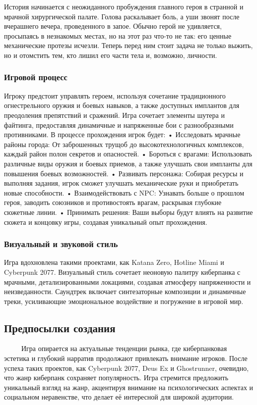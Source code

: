 \documentclass{article}
\begin{document}
История начинается с неожиданного пробуждения главного героя в странной и мрачной хирургической палате. Голова раскалывает боль, а уши звонят после вчерашнего вечера, проведенного в запое. Обычно герой не удивляется, просыпаясь в незнакомых местах, но на этот раз что-то не так: его ценные механические протезы исчезли. Теперь перед ним стоит задача не только выжить, но и отомстить тем, кто лишил его части тела и, возможно, личности.

\subsubsection{Игровой процесс}

Игроку предстоит управлять героем, используя сочетание традиционного огнестрельного оружия и боевых навыков, а также доступных имплантов для преодоления препятствий и сражений. Игра сочетает элементы шутера и файтинга, предоставляя динамичные и напряженные бои с разнообразными противниками. В процессе прохождения игрок будет:
 • Исследовать мрачные районы города: От заброшенных трущоб до высокотехнологичных комплексов, каждый район полон секретов и опасностей.
 • Бороться с врагами: Использовать различные виды оружия и боевых приемов, а также улучшать свои импланты для повышения боевых возможностей.
 • Развивать персонажа: Собирая ресурсы и выполняя задания, игрок сможет улучшать механические руки и приобретать новые способности.
 • Взаимодействовать с NPC: Узнавать больше о прошлом героя, заводить союзников и противостоять врагам, раскрывая глубокие сюжетные линии.
 • Принимать решения: Ваши выборы будут влиять на развитие сюжета и концовку игры, создавая уникальный опыт прохождения.

\subsubsection{Визуальный и звуковой стиль}

Игра вдохновлена такими проектами, как Katana Zero, Hotline Miami и Cyberpunk 2077. Визуальный стиль сочетает неоновую палитру киберпанка с мрачными, детализированными локациями, создавая атмосферу напряженности и неизведанности. Саундтрек включает синтезаторные композиции и динамичные треки, усиливающие эмоциональное воздействие и погружение в игровой мир.




\subsection{Предпосылки создания}
\ \ \ \ \ Игра опирается на актуальные тенденции рынка, где киберпанковая эстетика и глубокий нарратив продолжают привлекать внимание игроков. 
После успеха таких проектов, как Cyberpunk 2077, Deus Ex и Ghostrunner, очевидно, что жанр киберпанк сохраняет популярность.
Игра стремится предложить уникальный взгляд на жанр, акцентируя внимание на психологических аспектах и социальном неравенстве, 
что делает её интересной для широкой аудитории.
\end{document}

